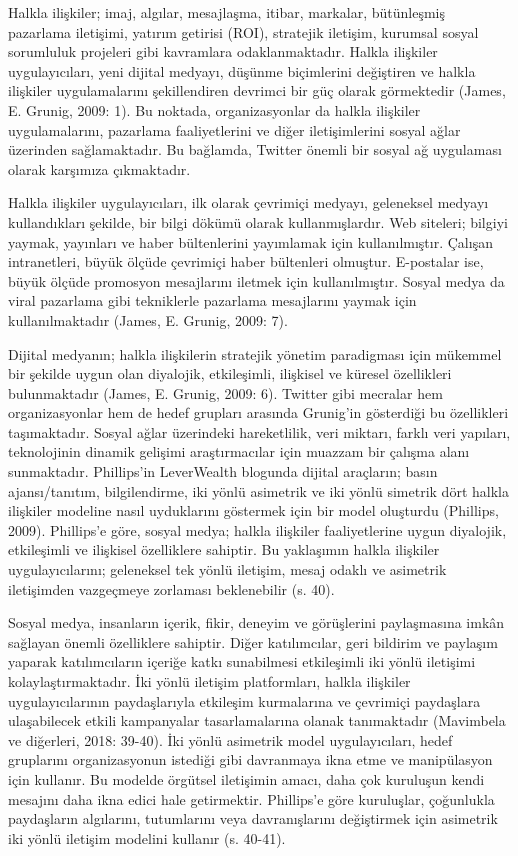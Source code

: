 \documentclass[
]{book}
\begin{document}
Halkla ilişkiler; imaj, algılar, mesajlaşma, itibar, markalar, bütünleşmiş pazarlama iletişimi, yatırım getirisi (ROI), stratejik iletişim, kurumsal sosyal sorumluluk projeleri gibi kavramlara odaklanmaktadır. Halkla ilişkiler uygulayıcıları, yeni dijital medyayı, düşünme biçimlerini değiştiren ve halkla ilişkiler uygulamalarını şekillendiren devrimci bir güç olarak görmektedir (James, E. Grunig, 2009: 1). \citep{grunig2009paradigms} Bu noktada, organizasyonlar da halkla ilişkiler uygulamalarını, pazarlama faaliyetlerini ve diğer iletişimlerini sosyal ağlar üzerinden sağlamaktadır. Bu bağlamda, Twitter önemli bir sosyal ağ uygulaması olarak karşımıza çıkmaktadır.

Halkla ilişkiler uygulayıcıları, ilk olarak çevrimiçi medyayı, geleneksel medyayı kullandıkları şekilde, bir bilgi dökümü olarak kullanmışlardır. Web siteleri; bilgiyi yaymak, yayınları ve haber bültenlerini yayımlamak için kullanılmıştır. Çalışan intranetleri, büyük ölçüde çevrimiçi haber bültenleri olmuştur. E-postalar ise, büyük ölçüde promosyon mesajlarını iletmek için kullanılmıştır. Sosyal medya da viral pazarlama gibi tekniklerle pazarlama mesajlarını yaymak için kullanılmaktadır (James, E. Grunig, 2009: 7). \citep{grunig2009paradigms}

Dijital medyanın; halkla ilişkilerin stratejik yönetim paradigması için mükemmel bir şekilde uygun olan diyalojik, etkileşimli, ilişkisel ve küresel özellikleri bulunmaktadır (James, E. Grunig, 2009: 6). Twitter gibi mecralar hem organizasyonlar hem de hedef grupları arasında Grunig'in gösterdiği bu özellikleri taşımaktadır. Sosyal ağlar üzerindeki hareketlilik, veri miktarı, farklı veri yapıları, teknolojinin dinamik gelişimi araştırmacılar için muazzam bir çalışma alanı sunmaktadır.
Phillips'in LeverWealth blogunda dijital araçların; basın ajansı/tanıtım, bilgilendirme, iki yönlü asimetrik ve iki yönlü simetrik dört halkla ilişkiler modeline nasıl uyduklarını göstermek için bir model oluşturdu (Phillips, 2009). Phillips'e göre, sosyal medya; halkla ilişkiler faaliyetlerine uygun diyalojik, etkileşimli ve ilişkisel özelliklere sahiptir. Bu yaklaşımın halkla ilişkiler uygulayıcılarını; geleneksel tek yönlü iletişim, mesaj odaklı ve asimetrik iletişimden vazgeçmeye zorlaması beklenebilir (s. 40). \citep{mavimbela2018perceived}

Sosyal medya, insanların içerik, fikir, deneyim ve görüşlerini paylaşmasına imkân sağlayan önemli özelliklere sahiptir. Diğer katılımcılar, geri bildirim ve paylaşım yaparak katılımcıların içeriğe katkı sunabilmesi etkileşimli iki yönlü iletişimi kolaylaştırmaktadır. İki yönlü iletişim platformları, halkla ilişkiler uygulayıcılarının paydaşlarıyla etkileşim kurmalarına ve çevrimiçi paydaşlara ulaşabilecek etkili kampanyalar tasarlamalarına olanak tanımaktadır (Mavimbela ve diğerleri, 2018: 39-40). İki yönlü asimetrik model uygulayıcıları, hedef gruplarını organizasyonun istediği gibi davranmaya ikna etme ve manipülasyon için kullanır. Bu modelde örgütsel iletişimin amacı, daha çok kuruluşun kendi mesajını daha ikna edici hale getirmektir. Phillips'e göre kuruluşlar, çoğunlukla paydaşların algılarını, tutumlarını veya davranışlarını değiştirmek için asimetrik iki yönlü iletişim modelini kullanır (s. 40-41). \citep{mavimbela2018perceived}
\end{document}
